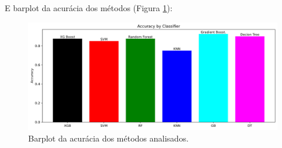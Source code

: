 \documentclass[
	article,			%
	11pt,				%
	oneside,			%
	a4paper,			%
	english,			%
	brazil,				%
	sumario=tradicional
	]{abntex2}
\begin{document}
E barplot da acurácia dos métodos (Figura \ref{fig:barplot}):

\begin{figure}[h!]
 \centering
 \includegraphics[scale=0.4]{fig/barplot.png}
 \caption{Barplot da acurácia dos métodos analisados.}
 \label{fig:barplot}
\end{figure}

\postextual



%
%






\end{document}
